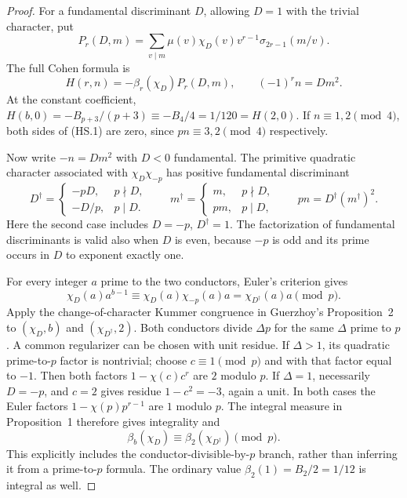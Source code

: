 \documentclass[11pt,a4paper]{article}
\theoremstyle{definition}
\begin{document}
\begin{proof}
For a fundamental discriminant $D$, allowing $D=1$ with the
trivial character, put
\[
 P_r(D,m)=\sum_{v\mid m}\mu(v)\chi_D(v)v^{r-1}
                                    \sigma_{2r-1}(m/v).
                                                               \tag{HS.2}
\]
The full Cohen formula is
\[
 H(r,n)=-\beta_r(\chi_D)P_r(D,m),
                  \qquad (-1)^rn=Dm^2.               \tag{HS.3}
\]
At the constant coefficient,
$H(b,0)=-B_{p+3}/(p+3)\equiv-B_4/4=1/120=H(2,0)$.
If $n\equiv1,2\pmod4$, both sides of (HS.1) are zero,
since $pn\equiv3,2\pmod4$ respectively.

Now write $-n=Dm^2$ with $D<0$ fundamental.  The primitive
quadratic character associated with $\chi_D\chi_{-p}$ has positive
fundamental discriminant
\[
 D^\dagger=
 \begin{cases}
  -pD,&p\nmid D,\\
  -D/p,&p\mid D.
 \end{cases}
 \qquad
 m^\dagger=
 \begin{cases}
  m,&p\nmid D,\\
  pm,&p\mid D,
 \end{cases}
 \qquad pn=D^\dagger(m^\dagger)^2.                    \tag{HS.4}
\]
Here the second case includes $D=-p$, $D^\dagger=1$.
The factorization of fundamental discriminants is valid also
when $D$ is even, because $-p$ is odd and its prime occurs in
$D$ to exponent exactly one.

For every integer $a$ prime to the two conductors,
Euler's criterion gives
\[
 \chi_D(a)a^{b-1}
       \equiv\chi_D(a)\chi_{-p}(a)a
       =\chi_{D^\dagger}(a)a\pmod p.                 \tag{HS.5}
\]
Apply the change-of-character Kummer congruence in Guerzhoy's
Proposition~2 to $(\chi_D,b)$ and $(\chi_{D^\dagger},2)$.
Both conductors divide $\Delta p$ for the same $\Delta$ prime to
$p$.  A common regularizer can be chosen with unit residue.
If $\Delta>1$, its quadratic prime-to-$p$ factor is nontrivial;
choose $c\equiv1\pmod p$ and with that factor equal to $-1$.
Then both factors $1-\chi(c)c^r$ are $2$ modulo $p$.
If $\Delta=1$, necessarily $D=-p$, and $c=2$ gives residue
$1-c^2=-3$, again a unit.  In both cases the Euler factors
$1-\chi(p)p^{r-1}$ are $1$ modulo $p$.
The integral measure in Proposition~1 therefore gives
integrality and
\[
                    \beta_b(\chi_D)
                    \equiv\beta_2(\chi_{D^\dagger})\pmod p.
                                                               \tag{HS.6}
\]
This explicitly includes the conductor-divisible-by-$p$ branch,
rather than inferring it from a prime-to-$p$ formula.
The ordinary value $\beta_2(1)=B_2/2=1/12$ is integral as well.


\end{proof}
\end{document}
